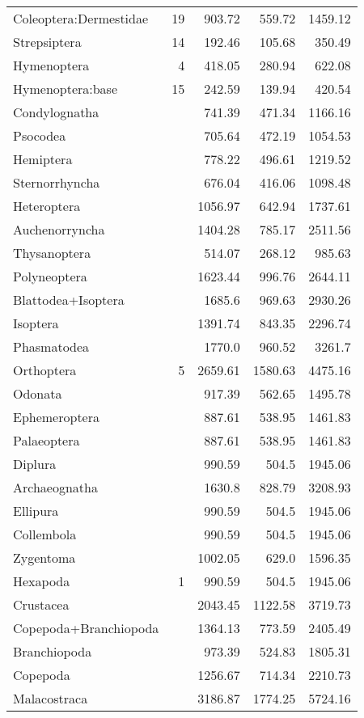 \begin{longtable}{lrrrr}
Coleoptera:Dermestidae & 19 & 903.72 & 559.72 & 1459.12 \\
Strepsiptera & 14 & 192.46 & 105.68 & 350.49 \\
Hymenoptera & 4 & 418.05 & 280.94 & 622.08 \\
Hymenoptera:base & 15 & 242.59 & 139.94 & 420.54 \\
Condylognatha &  & 741.39 & 471.34 & 1166.16 \\
Psocodea &  & 705.64 & 472.19 & 1054.53 \\
Hemiptera &  & 778.22 & 496.61 & 1219.52 \\
Sternorrhyncha &  & 676.04 & 416.06 & 1098.48 \\
Heteroptera &  & 1056.97 & 642.94 & 1737.61 \\
Auchenorryncha &  & 1404.28 & 785.17 & 2511.56 \\
Thysanoptera &  & 514.07 & 268.12 & 985.63 \\
Polyneoptera &  & 1623.44 & 996.76 & 2644.11 \\
Blattodea+Isoptera &  & 1685.6 & 969.63 & 2930.26 \\
Isoptera &  & 1391.74 & 843.35 & 2296.74 \\
Phasmatodea &  & 1770.0 & 960.52 & 3261.7 \\
Orthoptera & 5 & 2659.61 & 1580.63 & 4475.16 \\
Odonata &  & 917.39 & 562.65 & 1495.78 \\
Ephemeroptera &  & 887.61 & 538.95 & 1461.83 \\
Palaeoptera &  & 887.61 & 538.95 & 1461.83 \\
Diplura &  & 990.59 & 504.5 & 1945.06 \\
Archaeognatha &  & 1630.8 & 828.79 & 3208.93 \\
Ellipura &  & 990.59 & 504.5 & 1945.06 \\
Collembola &  & 990.59 & 504.5 & 1945.06 \\
Zygentoma &  & 1002.05 & 629.0 & 1596.35 \\
Hexapoda & 1 & 990.59 & 504.5 & 1945.06 \\
Crustacea &  & 2043.45 & 1122.58 & 3719.73 \\
Copepoda+Branchiopoda &  & 1364.13 & 773.59 & 2405.49 \\
Branchiopoda &  & 973.39 & 524.83 & 1805.31 \\
Copepoda &  & 1256.67 & 714.34 & 2210.73 \\
Malacostraca &  & 3186.87 & 1774.25 & 5724.16 \\
\end{longtable}

